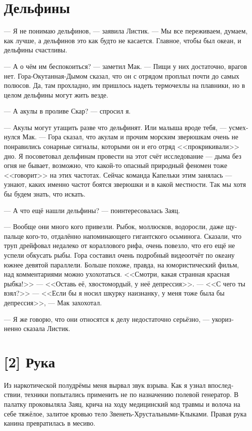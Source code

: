 \documentclass[a4paper,12pt,fleqn]{book}\usepackage{cooltooltips}\usepackage{polyglossia}\setdefaultlanguage[babelshorthands=true]{russian}\setotherlanguage{english}\defaultfontfeatures{Ligatures=TeX,Mapping=tex-text} \usepackage{xcolor}\definecolor{lightgray}{HTML}{bbbbbb}\color{lightgray}\newcommand{\ml}[3]{\textenglish{\textcolor{black}{#3}}}
\begin{document}
{\section{Дельфины}

--- Я не понимаю дельфинов, --- заявила Листик.
--- Мы все переживаем, думаем, как лучше, а дельфинов это как будто не касается.
Главное, чтобы был океан, и дельфины счастливы.

--- А о чём им беспокоиться? --- заметил Мак.
--- Пищи у них достаточно, врагов нет.
Гора-Окутанная-Дымом сказал, что он с отрядом проплыл почти до самых полюсов.
Да, там прохладно, им пришлось надеть термочехлы на плавники, но в целом дельфины могут жить везде.

--- А акулы в проливе Скар? --- спросил я.

--- Акулы могут утащить разве что дельфинят.
Или малыша вроде тебя, --- усмехнулся Мак.
--- Гора сказал, что акулам и прочим морским зверюшкам очень не понравились сонарные сигналы, которыми он и его отряд <<прокрикивали>> дно.
Я посоветовал дельфинам провести на этот счёт исследование --- дыма без огня не бывает, возможно, что какой-то опасный природный феномен тоже <<говорит>> на этих частотах.
Сейчас команда Капельки этим занялась --- узнают, каких именно частот боятся зверюшки и в какой местности.
Так мы хотя бы будем знать, что искать.

--- А что ещё нашли дельфины? --- поинтересовалась Заяц.

--- Вообще они много кого привезли.
Рыбок, моллюсков, водоросли, даже щупальце кого-то, отдалённо напоминающего гигантского осьминога.
Сказали, что труп дрейфовал недалеко от кораллового рифа, очень повезло, что его ещё не успели обкусать рыбы.
Гора составил очень подробный видеоотчёт по океану южнее девятой параллели.
Больше похоже, правда, на юмористический фильм, над комментариями можно ухохотаться.
<<Смотри, какая странная красная рыбка!>>
--- <<Оставь её, хвостомордый, у неё депрессия>>.
--- <<С чего ты взял?>>
--- <<Если бы я носил шкурку наизнанку, у меня тоже была бы депрессия>>, --- Мак захохотал.

--- Я же говорю, что они относятся к делу недостаточно серьёзно, --- укоризненно сказала Листик.

\section{[2] Рука}

Из наркотической полудрёмы меня вырвал звук взрыва.
Как я узнал впоследствии, техники попытались применить не по назначению полевой генератор.
В палатку проковыляла Заяц, крича на ходу медицинский код травмы и волоча на себе тяжёлое, залитое кровью тело Звенеть-Хрустальными-Клыками.
Правая рука канина превратилась в месиво.

}
\end{document}
